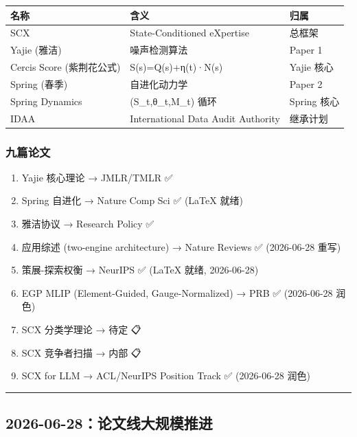 \documentclass[
  12pt,
]{ctexart}
\providecommand{\tightlist}{%
  \setlength{\itemsep}{0pt}\setlength{\parskip}{0pt}}
\begin{document}
\begin{longtable}[]{@{}lll@{}}
\toprule\noalign{}
名称 & 含义 & 归属 \\
\midrule\noalign{}
\endhead
\bottomrule\noalign{}
\endlastfoot
SCX & State-Conditioned eXpertise & 总框架 \\
Yajie (雅洁) & 噪声检测算法 & Paper 1 \\
Cercis Score (紫荆花公式) & S(s)=Q(s)+η(t)·N(s) & Yajie 核心 \\
Spring (春季) & 自进化动力学 & Paper 2 \\
Spring Dynamics & (S\_t,θ\_t,M\_t) 循环 & Spring 核心 \\
IDAA & International Data Audit Authority & 继承计划 \\
\end{longtable}

\subsubsection{九篇论文}\label{ux4e5dux7bc7ux8bbaux6587}

\begin{enumerate}
\def\labelenumi{\arabic{enumi}.}
\tightlist
\item
  Yajie 核心理论 → JMLR/TMLR ✅
\item
  Spring 自进化 → Nature Comp Sci ✅ (LaTeX 就绪)
\item
  雅洁协议 → Research Policy ✅
\item
  应用综述 (two-engine architecture) → Nature Reviews ✅ (2026-06-28
  重写)
\item
  策展-探索权衡 → NeurIPS ✅ (LaTeX 就绪, 2026-06-28)
\item
  EGP MLIP (Element-Guided, Gauge-Normalized) → PRB ✅ (2026-06-28 润色)
\item
  SCX 分类学理论 → 待定 📋
\item
  SCX 竞争者扫描 → 内部 📋
\item
  SCX for LLM → ACL/NeurIPS Position Track ✅ (2026-06-28 润色)
\end{enumerate}

\begin{center}\rule{0.5\linewidth}{0.5pt}\end{center}

\subsection{2026-06-28：论文线大规模推进}\label{ux8bbaux6587ux7ebfux5927ux89c4ux6a21ux63a8ux8fdb}
\end{document}
